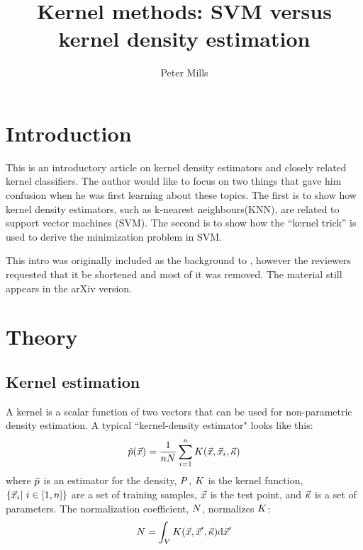 \documentclass{article}
\newenvironment{eqnnon}{\begin{equation}}{\end{equation}}
\begin{document}
\title{Kernel methods: SVM versus kernel density estimation}

\author{Peter Mills}

\maketitle

\tableofcontents

\section{Introduction}

This is an introductory article on kernel density estimators and closely
related kernel classifiers.
The author would like to focus on two things that gave him confusion when he was
first learning about these topics.
The first is to show how kernel density estimators, 
such as k-nearest neighbours(KNN),
are related to support vector machines (SVM).
The second is to show how the ``kernel trick'' is used to derive the
minimization problem in SVM.

This intro was originally included as the background to \citet{Mills2012},
however the reviewers requested that it be shortened and most of it was
removed.
The material still appears in the arXiv version.

\section{Theory}

\label{theory}

\subsection{Kernel estimation}

A kernel is a scalar function of two vectors that can be used for 
non-parametric density estimation. A typical ``kernel-density estimator"
looks like this:
\begin{eqnnon}
	\densityestimator(\testpoint) = \frac {1}{\nsample \norm} \sum_{i=1}^\nsample \vectorkernel(\testpoint, \sample_i, \kernelparam)
	\label{kernel_estimator}
\end{eqnnon}
where $\tilde p$ is an estimator for the density, $P$, 
$K$ is the kernel function,
$\lbrace \vec {x}_i | ~ i \in [1,n] \rbrace$ are a set of training samples, 
$\vec {x}$ is the test point,
and $\vec \kappa$ is a set of parameters. 
The normalization coefficient, $N$, normalizes $K$:
\begin{eqnnon}
	\norm = \int_V \vectorkernel(\point, \point^\prime, \kernelparam) \mathrm d \point^\prime
	\label{norm_def}
\end{eqnnon}
\end{document}
